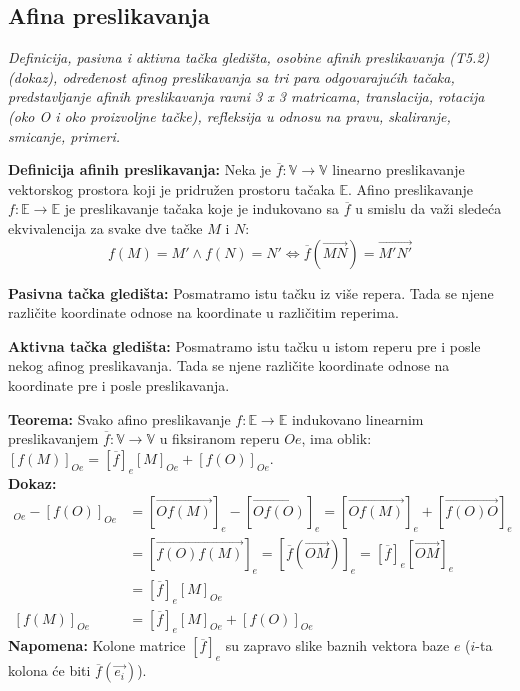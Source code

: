 \documentclass[12pt]{article}
\newcommand{\vek}[1]{\overrightarrow{#1}}
\begin{document}
\subsection{Afina preslikavanja}
\textit{Definicija, pasivna i aktivna tačka gledišta, osobine afinih preslikavanja
    (T5.2) (dokaz), određenost afinog preslikavanja sa tri para odgovarajućih
    tačaka, predstavljanje afinih preslikavanja ravni 3 x 3 matricama, translacija,
    rotacija (oko O i oko proizvoljne tačke), refleksija u odnosu na pravu,
    skaliranje, smicanje, primeri.}
\par

\vspace*{1cm}

\textbf{Definicija afinih preslikavanja:} Neka je
$\overline{f}: \mathbb{V}\rightarrow\mathbb{V}$ linearno preslikavanje
vektorskog prostora koji je pridružen prostoru tačaka $\mathbb{E}$. Afino
preslikavanje $f: \mathbb{E}\rightarrow\mathbb{E}$ je preslikavanje tačaka koje
je indukovano sa $\overline{f}$ u smislu da važi sledeća ekvivalencija za svake
dve tačke $M$ i $N$:
$$f(M)=M'\land f(N)=N' \iff \overline{f}(\vek{MN})=\vek{M'N'}$$
\par

\textbf{Pasivna tačka gledišta:} Posmatramo istu tačku iz više repera. Tada se
njene različite koordinate odnose na koordinate u različitim reperima.
\par

\textbf{Aktivna tačka gledišta:} Posmatramo istu tačku u istom reperu pre i
posle nekog afinog preslikavanja. Tada se njene različite koordinate odnose na
koordinate pre i posle preslikavanja.

\textbf{Teorema:} Svako afino preslikavanje
$f:\mathbb{E}\rightarrow\mathbb{E}$ indukovano linearnim preslikavanjem
$\overline{f}:\mathbb{V}\rightarrow\mathbb{V}$ u fiksiranom reperu $Oe$, ima oblik:
$[f(M)]_{Oe}=[\overline{f}]_{e}[M]_{Oe}+[f(O)]_{Oe}$.\\
\textbf{Dokaz:}
\begin{align*}
    [f(M)]_{Oe}-[f(O)]_{Oe} & =[\vek{Of(M)}]_e-[\vek{Of(O)}]_e =[\vek{Of(M)}]_e+[\vek{f(O)O}]_e            \\
                            & =[\vek{f(O)f(M)}]_e=[\overline{f}(\vek{OM})]_e =[\overline{f}]_e[\vek{OM}]_e \\
                            & =[\overline{f}]_e[M]_{Oe}                                                    \\
    [f(M)]_{Oe}             & =[\overline{f}]_{e}[M]_{Oe}+[f(O)]_{Oe}
\end{align*}
\textbf{Napomena:} Kolone matrice $[\overline{f}]_e$ su zapravo slike baznih
vektora baze $e$ ($i$-ta kolona će biti $\overline{f}(\vek{e_i})$).
\par
\end{document}
